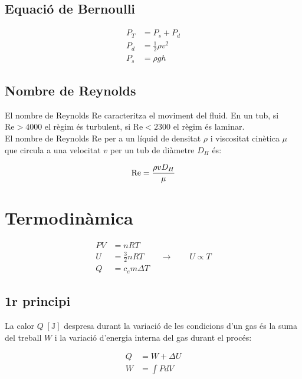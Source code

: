 \subsection{Equació de Bernoulli}
\label{sub:equaci_de_bernoulli}

\begin{align}
    P_T &= P_s + P_d\\
    P_d &= \frac{1}{2}\rho v^2\\
    P_s &= \rho g h
\end{align}

\subsection{Nombre de Reynolds}
\label{sub:nombre_de_reynolds}

El nombre de Reynolds  Re caracteritza el moviment del fluid. En un tub, si
$\mathrm{Re} > 4000$ el règim és turbulent, si $\mathrm{Re} < 2300$ el règim és laminar.\\

El nombre de Reynolds Re per a un líquid de densitat $\rho$ i viscositat cinètica $\mu$ que circula a una velocitat $v$ per un tub de diàmetre $D_H$ és:

\begin{equation}
    \mathrm{Re} = {{\rho v D_H} \over {\mu}} 
\end{equation}

\section{Termodinàmica}
\label{sec:termodinamica}

\begin{align}
    PV &= nRT \\
    U &= \frac{3}{2}nRT \qquad \rightarrow \qquad U \propto T \\
    Q &= c_em\Delta T
\end{align}

\subsection{1r principi}
\label{sub:1r_principi}

La calor $Q\;[\si{\joule}]$ despresa durant la variació de les condicions d'un
gas és la suma del treball $W$ i la variació d'energia interna del gas durant
el procés:

\begin{align}
    Q &= W + \Delta U \\
    W &= \int P dV
\end{align}


